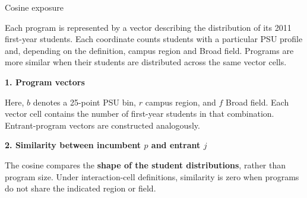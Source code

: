 \documentclass{beamer}
\begin{document}
\begin{frame}{Cosine exposure}

\scriptsize
\setlength{\abovedisplayskip}{2pt}
\setlength{\belowdisplayskip}{2pt}

\tiny
Each program is represented by a vector describing the distribution of its
2011 first-year students. Each coordinate counts students with a particular
PSU profile and, depending on the definition, campus region and Broad field.
Programs are more similar when their students are distributed across the same
vector cells.

\vspace{0.06cm}

\textbf{1. Program vectors}

\begin{center}
\end{center}

\vspace{-0.10cm}

Here, \(b\) denotes a 25-point PSU bin, \(r\) campus region, and \(f\) Broad
field. Each vector cell contains the number of first-year students in that
combination. Entrant-program vectors are constructed analogously.

\vspace{0.05cm}

\textbf{2. Similarity between incumbent \(p\) and entrant \(j\)}

\begin{center}
\end{center}

\vspace{-0.10cm}

The cosine compares the \textbf{shape of the student distributions}, rather
than program size. Under interaction-cell definitions, similarity is zero
when programs do not share the indicated region or field.


\end{frame}
\end{document}
